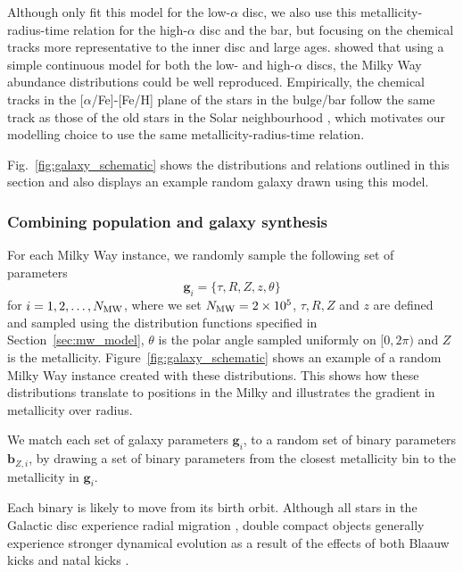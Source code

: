 Although \citet{Frankel+2018} only fit this model for the low-$\alpha$ disc, we also use this metallicity-radius-time relation for the high-$\alpha$ disc and the bar, but focusing on the chemical tracks more representative to the inner disc and large ages. \citet{Sharma+2020} showed that using a simple continuous model for both the low- and high-$\alpha$ discs, the Milky Way abundance distributions could be well reproduced. Empirically, the chemical tracks in the [$\alpha$/Fe]-[Fe/H] plane of the stars in the bulge/bar follow the same track as those of the old stars in the Solar neighbourhood \citep[][Fig.~7,]{Bovy+2019}, which motivates our modelling choice to use the same metallicity-radius-time relation.

Fig.~\ref{fig:galaxy_schematic} shows the distributions and relations outlined in this section and also displays an example random galaxy drawn using this model.

\subsubsection{Combining population and galaxy synthesis}\label{sec:combining_pop_gal}

For each Milky Way instance, we randomly sample the following set of parameters
\begin{equation}
    \mathbf{g}_{{i}} = \{\tau, R, Z, z, \theta\}
\end{equation}
for $i = 1, 2, \dots, N_{\rm MW}$, where we set $N_{\rm MW} = 2 \times 10^{5}$, $\tau, R, Z$ and $z$ are defined and sampled using the distribution functions specified in Section~\ref{sec:mw_model}, $\theta$ is the polar angle sampled uniformly on $[0, 2\pi)$ and $Z$ is the metallicity. Figure~\ref{fig:galaxy_schematic} shows an example of a random Milky Way instance created with these distributions. This shows how these distributions translate to positions in the Milky and illustrates the gradient in metallicity over radius.

We match each set of galaxy parameters $\mathbf{g}_{{i}}$, to a random set of binary parameters $\mathbf{b}_{{Z, i}}$, by drawing a set of binary parameters from the closest metallicity bin to the metallicity in $\mathbf{g}_{{i}}$.

Each binary is likely to move from its birth orbit. Although all stars in the Galactic disc experience radial migration \citep{Sellwood+2002, Frankel+2018}, double compact objects generally experience stronger dynamical evolution as a result of the effects of both Blaauw kicks \citep{Blaauw+1961} and natal kicks \citep[e.g.][]{Hobbs+2005}.

